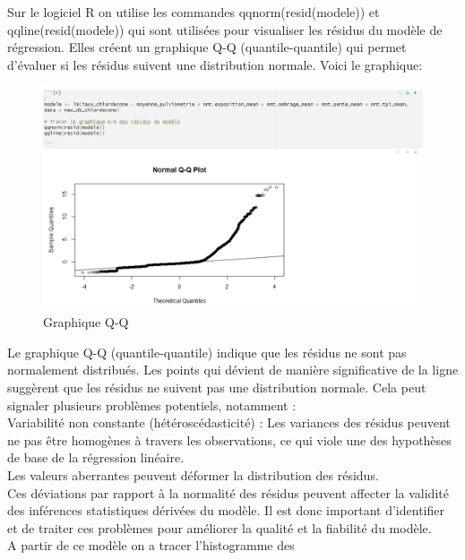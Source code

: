\documentclass{report}
\begin{document}
Sur le logiciel R on utilise les commandes qqnorm(resid(modele)) et qqline(resid(modele)) qui sont utilisées pour visualiser les résidus du modèle de régression. Elles créent un graphique Q-Q (quantile-quantile) qui permet d'évaluer si les résidus suivent une distribution normale. Voici le graphique:

\begin{figure}[!h]
\centering
\includegraphics[width = 1
\linewidth]{graphiqueQQ.png}
\caption{Graphique Q-Q}
\end{figure}

Le graphique Q-Q (quantile-quantile) indique que les résidus ne sont pas normalement distribués. Les points qui dévient de manière significative de la ligne suggèrent que les résidus ne suivent pas une distribution normale. 
Cela peut signaler plusieurs problèmes potentiels, notamment :\\
Variabilité non constante (hétéroscédasticité) : Les variances des résidus peuvent ne pas être homogènes à travers les observations, ce qui viole une des hypothèses de base de la régression linéaire.\\
Les valeurs aberrantes peuvent déformer la distribution des résidus.\\





Ces déviations par rapport à la normalité des résidus peuvent affecter la validité des inférences statistiques dérivées du modèle. Il est donc important d'identifier et de traiter ces problèmes pour améliorer la qualité et la fiabilité du modèle.\\

A partir de ce modèle on a tracer l'histogramme des 
\end{document}
